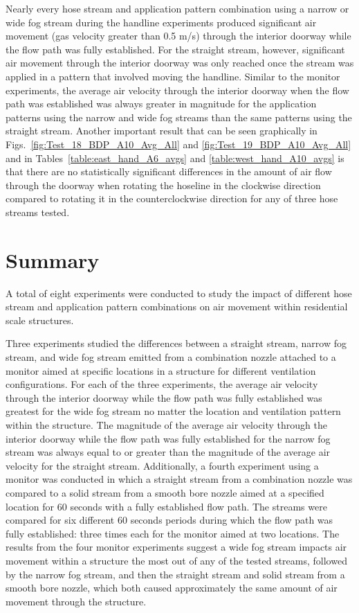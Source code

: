 \documentclass[12pt,oneside]{book}
\begin{document}
Nearly every hose stream and application pattern combination using a narrow or wide fog stream during the handline experiments produced significant air movement (gas velocity greater than 0.5 m/s) through the interior doorway while the flow path was fully established. For the straight stream, however, significant air movement through the interior doorway was only reached once the stream was applied in a pattern that involved moving the handline. Similar to the monitor experiments, the average air velocity through the interior doorway when the flow path was established was always greater in magnitude for the application patterns using the narrow and wide fog streams than the same patterns using the straight stream. Another important result that can be seen graphically in Figs.~\ref{fig:Test_18_BDP_A10_Avg_All} and \ref{fig:Test_19_BDP_A10_Avg_All} and in Tables~\ref{table:east_hand_A6_avgs} and \ref{table:west_hand_A10_avgs} is that there are no statistically significant differences in the amount of air flow through the doorway when rotating the hoseline in the clockwise direction compared to rotating it in the counterclockwise direction for any of three hose streams tested. 


\chapter{Summary}
\label{chap:summary}

A total of eight experiments were conducted to study the impact of different hose stream and application pattern combinations on air movement within residential scale structures. 

Three experiments studied the differences between a straight stream, narrow fog stream, and wide fog stream emitted from a combination nozzle attached to a monitor aimed at specific locations in a structure for different ventilation configurations. For each of the three experiments, the average air velocity through the interior doorway while the flow path was fully established was greatest for the wide fog stream no matter the location and ventilation pattern within the structure. The magnitude of the average air velocity through the interior doorway while the flow path was fully established for the narrow fog stream was always equal to or greater than the magnitude of the average air velocity for the straight stream. Additionally, a fourth experiment using a monitor was conducted in which a straight stream from a combination nozzle was compared to a solid stream from a smooth bore nozzle aimed at a specified location for 60 seconds with a fully established flow path. The streams were compared for six different 60 seconds periods during which the flow path was fully established: three times each for the monitor aimed at two locations. The results from the four monitor experiments suggest a wide fog stream impacts air movement within a structure the most out of any of the tested streams, followed by the narrow fog stream, and then the straight stream and solid stream from a smooth bore nozzle, which both caused approximately the same amount of air movement through the structure.
\end{document}
